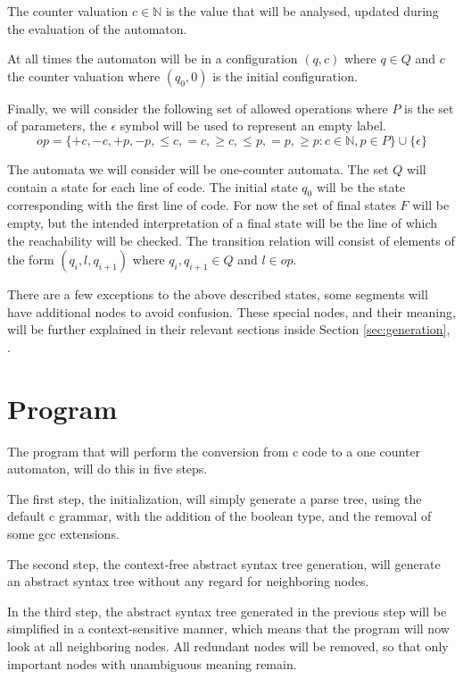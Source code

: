 \documentclass[12pt]{article}
\begin{document}
The counter valuation $c \in \mathbb{N}$ is the value that will be analysed, updated during the evaluation of the automaton.

At all times the automaton will be in a configuration $(q, c)$ where $q \in Q$ and $c$ the counter valuation where $(q_0, 0)$ is the initial configuration.

Finally, we will consider the following set of allowed operations where $P$ is the set of parameters, the $\epsilon$ symbol will be used to represent an empty label.
\[
 op = \{+c, -c, +p, -p, \leq c, =c, \geq c, \leq p, =p, \geq p: c \in \mathbb{N}, p \in P\} \cup \{\epsilon\}
\]

The automata we will consider will be one-counter automata. The set $Q$ will contain a state for each line of code. The initial state $q_0$ will be the state corresponding with the first line of code. For now the set of final states $F$ will be empty, but the intended interpretation of a final state will be the line of which the reachability will be checked. The transition relation will consist of elements of the form $(q_i, l, q_{i+1})$ where $q_i, q_{i+1} \in Q$ and $l \in op$. 

There are a few exceptions to the above described states, some segments will have additional nodes to avoid confusion. These special nodes, and their meaning, will be further explained in their relevant sections inside Section \ref{sec:generation}, .

\section{Program}
The program that will perform the conversion from c code to a one counter automaton, will do this in five steps.

The first step, the initialization, will simply generate a parse tree, using the default c grammar, with the addition of the boolean type, and the removal of some gcc extensions.

The second step, the context-free abstract syntax tree generation, will generate an abstract syntax tree without any regard for neighboring nodes.

In the third step, the abstract syntax tree generated in the previous step will be simplified in a context-sensitive manner, which means that the program will now look at all neighboring nodes. All redundant nodes will be removed, so that only important nodes with unambiguous meaning remain.
\end{document}
